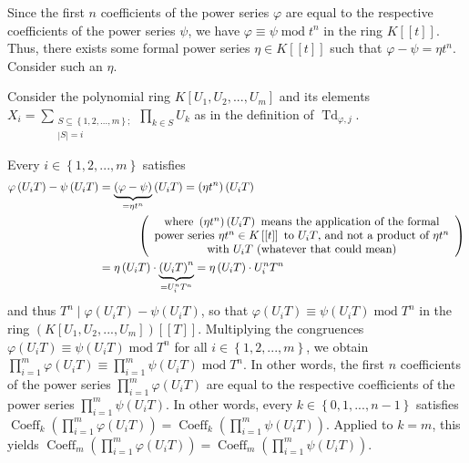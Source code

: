 \documentclass[numbers=enddot,12pt,final,onecolumn,notitlepage]{scrartcl}%
\begin{document}
Since the first $n$ coefficients of the power series $\varphi$ are equal to
the respective coefficients of the power series $\psi$, we have $\varphi
\equiv\psi\operatorname{mod}t^{n}$ in the ring $K\left[  \left[  t\right]
\right]  $. Thus, there exists some formal power series $\eta\in K\left[
\left[  t\right]  \right]  $ such that $\varphi-\psi=\eta t^{n}$. Consider
such an $\eta$.

Consider the polynomial ring $K\left[  U_{1},U_{2},...,U_{m}\right]  $ and its
elements $X_{i}=\sum\limits_{\substack{S\subseteq\left\{  1,2,...,m\right\}
;\\\left\vert S\right\vert =i}}\prod\limits_{k\in S}U_{k}$ as in the
definition of $\operatorname*{Td}\nolimits_{\varphi,j}$.

Every $i\in\left\{  1,2,...,m\right\}  $ satisfies%
\begin{align*}
\varphi\left(  U_{i}T\right)  -\psi\left(  U_{i}T\right)   &
=\underbrace{\left(  \varphi-\psi\right)  }_{=\eta t^{n}}\left(
U_{i}T\right)  =\left(  \eta t^{n}\right)  \left(  U_{i}T\right) \\
&  \ \ \ \ \ \ \ \ \ \ \left(
\begin{array}
[c]{c}%
\text{where }\left(  \eta t^{n}\right)  \left(  U_{i}T\right)  \text{ means
the application of the formal}\\
\text{power series }\eta t^{n}\in K\left[  \left[  t\right]  \right]  \text{
to }U_{i}T\text{, and not a product of }\eta t^{n}\\
\text{with }U_{i}T\text{ (whatever that could mean)}%
\end{array}
\right) \\
&  =\eta\left(  U_{i}T\right)  \cdot\underbrace{\left(  U_{i}T\right)  ^{n}%
}_{=U_{i}^{n}T^{n}}=\eta\left(  U_{i}T\right)  \cdot U_{i}^{n}T^{n}%
\end{align*}
and thus $T^{n}\mid\varphi\left(  U_{i}T\right)  -\psi\left(  U_{i}T\right)
$, so that $\varphi\left(  U_{i}T\right)  \equiv\psi\left(  U_{i}T\right)
\operatorname{mod}T^{n}$ in the ring $\left(  K\left[  U_{1},U_{2}%
,...,U_{m}\right]  \right)  \left[  \left[  T\right]  \right]  $. Multiplying
the congruences $\varphi\left(  U_{i}T\right)  \equiv\psi\left(
U_{i}T\right)  \operatorname{mod}T^{n}$ for all $i\in\left\{
1,2,...,m\right\}  $, we obtain $\prod\limits_{i=1}^{m}\varphi\left(
U_{i}T\right)  \equiv\prod\limits_{i=1}^{m}\psi\left(  U_{i}T\right)
\operatorname{mod}T^{n}$. In other words, the first $n$ coefficients of the
power series $\prod\limits_{i=1}^{m}\varphi\left(  U_{i}T\right)  $ are equal
to the respective coefficients of the power series $\prod\limits_{i=1}^{m}%
\psi\left(  U_{i}T\right)  $. In other words, every $k\in\left\{
0,1,...,n-1\right\}  $ satisfies $\operatorname*{Coeff}\nolimits_{k}\left(
\prod\limits_{i=1}^{m}\varphi\left(  U_{i}T\right)  \right)
=\operatorname*{Coeff}\nolimits_{k}\left(  \prod\limits_{i=1}^{m}\psi\left(
U_{i}T\right)  \right)  $. Applied to $k=m$, this yields
$\operatorname*{Coeff}\nolimits_{m}\left(  \prod\limits_{i=1}^{m}%
\varphi\left(  U_{i}T\right)  \right)  =\operatorname*{Coeff}\nolimits_{m}%
\left(  \prod\limits_{i=1}^{m}\psi\left(  U_{i}T\right)  \right)  $.
\end{document}
